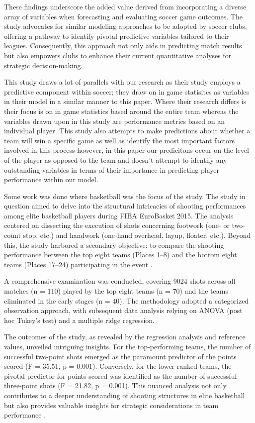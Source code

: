 \documentclass[12pt]{article}
\begin{document}
These findings underscore the added value derived from incorporating a diverse
array of variables when forecasting and evaluating soccer game outcomes. The
study advocates for similar modeling approaches to be adopted by soccer clubs,
offering a pathway to identify pivotal predictive variables tailored to their
leagues. Consequently, this approach not only aids in predicting match results
but also empowers clubs to enhance their current quantitative analyses for
strategic decision-making.

This study draws a lot of parallels with our research as their study employs
a predictive component within soccer; they draw on in game statisitcs as variables
in their model in a similar manner to this paper. Where their research differs
is their focus is on in game statistics based around the entire team
whereas the variables drawn upon in this study are performance metrics based on 
an individual player. This study also attempts to make predictions about whether
a team will win a specific game as well as identify the most important factors
involved in this process however, in this paper our predicitons occur on the
level of the player as opposed to the team and doesn't attempt to identify
any outstanding variables in terms of their importance in predicting player 
performance within our model.


Some work was done where basketball was the focus of the study. 
The study in question aimed to delve into the structural intricacies of shooting
performances among elite basketball players during FIBA EuroBasket 2015.
The analysis centered on dissecting the execution of shots concerning footwork
(one- or two-count stop, etc.) and handwork (one-hand overhead, layup, floater, etc.). 
Beyond this, the study harbored a secondary objective: to compare the shooting
performance between the top eight teams (Places 1–8) and the bottom eight teams
(Places 17–24) participating in the event \citep{gryko2018structural}.

A comprehensive examination was conducted, covering 9024 shots across all matches
(n = 110) played by the top eight teams (n = 70) and the teams eliminated in the
early stages (n = 40). The methodology adopted a categorized observation approach,
with subsequent data analysis relying on ANOVA (post hoc Tukey’s test) and a
multiple ridge regression.

The outcomes of the study, as revealed by the regression analysis and reference
values, unveiled intriguing insights. For the top-performing teams, the number of
successful two-point shots emerged as the paramount predictor of the points scored
(F = 35.51, p = 0.001). Conversely, for the lower-ranked teams, the pivotal
predictor for points scored was identified as the number of successful
three-point shots (F = 21.82, p = 0.001). This nuanced analysis not only
contributes to a deeper understanding of shooting structures in elite basketball
but also provides valuable insights for strategic considerations in team
performance \citep{gryko2018structural}.
\end{document}
